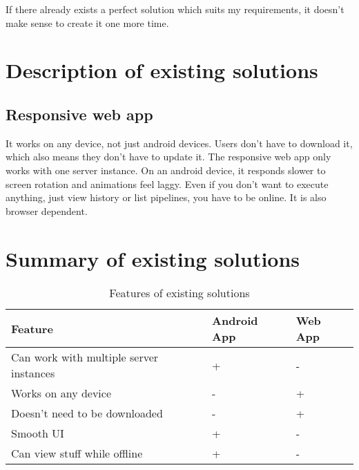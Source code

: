 If there already exists a perfect solution which suits my requirements, it doesn't make sense to create it one more time.

\section{Description of existing solutions}

\subsection{Responsive web app}
It works on any device, not just android devices. Users don't have to download it, which also means they don't have to update it. The responsive web app only works with one server instance. On an android device, it responds slower to screen rotation and animations feel laggy. Even if you don't want to execute anything, just view history or list pipelines, you have to be online. It is also browser dependent.

\section{Summary of existing solutions}

\begin{table}[h]\centering
\caption[Existing solutions]{Features of existing solutions}\label{tab:existingSolutionsTable}
\begin{tabular}{l|l|l}
\hline
Feature & Android App & Web App \\ \hline
Can work with multiple server instances & + & - \\ \hline
Works on any device & - & + \\ \hline
Doesn't need to be downloaded & - & + \\ \hline
Smooth UI & + & - \\ \hline
Can view stuff while offline & + & - \\ \hline
\end{tabular}
\end{table}